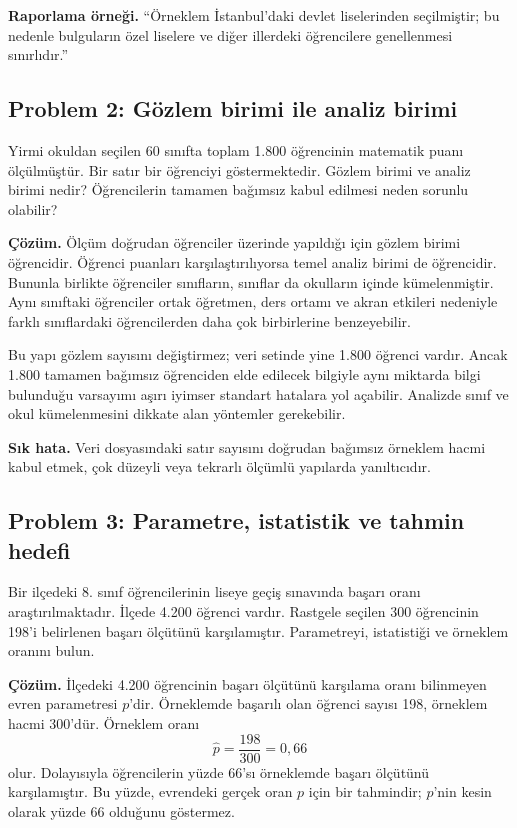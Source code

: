 \textbf{Raporlama örneği.} ``Örneklem İstanbul'daki devlet liselerinden
seçilmiştir; bu nedenle bulguların özel liselere ve diğer illerdeki öğrencilere
genellenmesi sınırlıdır.''

\subsection*{Problem 2: Gözlem birimi ile analiz birimi}

Yirmi okuldan seçilen 60 sınıfta toplam 1.800 öğrencinin matematik puanı
ölçülmüştür. Bir satır bir öğrenciyi göstermektedir. Gözlem birimi ve analiz
birimi nedir? Öğrencilerin tamamen bağımsız kabul edilmesi neden sorunlu
olabilir?

\textbf{Çözüm.} Ölçüm doğrudan öğrenciler üzerinde yapıldığı için gözlem
birimi öğrencidir. Öğrenci puanları karşılaştırılıyorsa temel analiz birimi de
öğrencidir. Bununla birlikte öğrenciler sınıfların, sınıflar da okulların
içinde kümelenmiştir. Aynı sınıftaki öğrenciler ortak öğretmen, ders ortamı ve
akran etkileri nedeniyle farklı sınıflardaki öğrencilerden daha çok
birbirlerine benzeyebilir.

Bu yapı gözlem sayısını değiştirmez; veri setinde yine 1.800 öğrenci vardır.
Ancak 1.800 tamamen bağımsız öğrenciden elde edilecek bilgiyle aynı miktarda
bilgi bulunduğu varsayımı aşırı iyimser standart hatalara yol açabilir.
Analizde sınıf ve okul kümelenmesini dikkate alan yöntemler gerekebilir.

\textbf{Sık hata.} Veri dosyasındaki satır sayısını doğrudan bağımsız örneklem
hacmi kabul etmek, çok düzeyli veya tekrarlı ölçümlü yapılarda yanıltıcıdır.

\subsection*{Problem 3: Parametre, istatistik ve tahmin hedefi}

Bir ilçedeki 8. sınıf öğrencilerinin liseye geçiş sınavında başarı oranı
araştırılmaktadır. İlçede 4.200 öğrenci vardır. Rastgele seçilen 300 öğrencinin
198'i belirlenen başarı ölçütünü karşılamıştır. Parametreyi, istatistiği ve
örneklem oranını bulun.

\textbf{Çözüm.} İlçedeki 4.200 öğrencinin başarı ölçütünü karşılama oranı
bilinmeyen evren parametresi $p$'dir. Örneklemde başarılı olan öğrenci sayısı
198, örneklem hacmi 300'dür. Örneklem oranı
\[
\hat p=\frac{198}{300}=0{,}66
\]
olur. Dolayısıyla öğrencilerin yüzde 66'sı örneklemde başarı ölçütünü
karşılamıştır. Bu yüzde, evrendeki gerçek oran $p$ için bir tahmindir; $p$'nin
kesin olarak yüzde 66 olduğunu göstermez.

